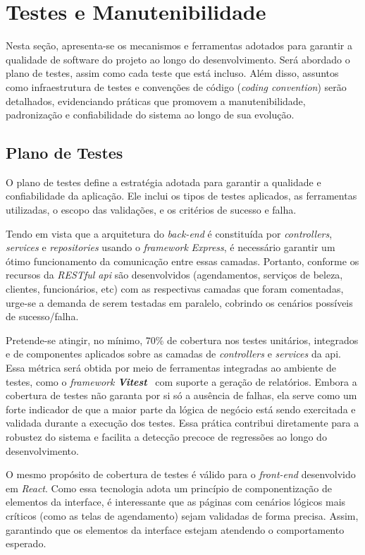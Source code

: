 \section{Testes e Manutenibilidade}
Nesta seção, apresenta-se os mecanismos e ferramentas adotados para garantir a qualidade de software do projeto ao longo do desenvolvimento.
Será abordado o plano de testes, assim como cada teste que está incluso. Além disso, assuntos como infraestrutura de testes e convenções de código (\textit{coding convention})
serão detalhados, evidenciando práticas que promovem a manutenibilidade, padronização e confiabilidade do sistema ao longo de sua evolução.

\subsection{Plano de Testes}
O plano de testes define a estratégia adotada para garantir a qualidade e confiabilidade da aplicação. 
Ele inclui os tipos de testes aplicados, as ferramentas utilizadas, o escopo das validações, e os critérios de sucesso e falha.

Tendo em vista que a arquitetura do \textit{back-end} é constituída por \textit{controllers}, \textit{services} e \textit{repositories} usando o \emph{framework} \textit{Express}, 
é necessário garantir um ótimo funcionamento da comunicação entre essas camadas. Portanto, conforme os recursos da \textit{RESTful \gls{api}} são desenvolvidos (agendamentos, serviços de beleza, clientes, funcionários, etc) com as respectivas camadas que foram comentadas, urge-se a demanda de serem testadas em paralelo, cobrindo os cenários possíveis de sucesso/falha. 

Pretende-se atingir, no mínimo, 70\% de cobertura nos testes unitários, integrados e de componentes aplicados sobre as camadas de \textit{controllers} e \textit{services} da \gls{api}. Essa métrica será obtida por meio de ferramentas integradas ao ambiente de testes, como o \textit{framework} \textbf{\textit{Vitest}}~\cite{vitest-2025} com suporte a geração de relatórios. Embora a cobertura de testes não garanta por si só a ausência de falhas, ela serve como um forte indicador de que a maior parte da lógica de negócio está sendo exercitada e validada durante a execução dos testes. Essa prática contribui diretamente para a robustez do sistema e facilita a detecção precoce de regressões ao longo do desenvolvimento.

O mesmo propósito de cobertura de testes é válido para o \textit{front-end} desenvolvido em \textit{React}. Como essa tecnologia adota um princípio de componentização de elementos da interface, é interessante que as páginas com cenários lógicos mais críticos (como as telas de agendamento) sejam validadas de forma precisa. Assim, garantindo que os elementos da interface estejam atendendo o comportamento esperado.

